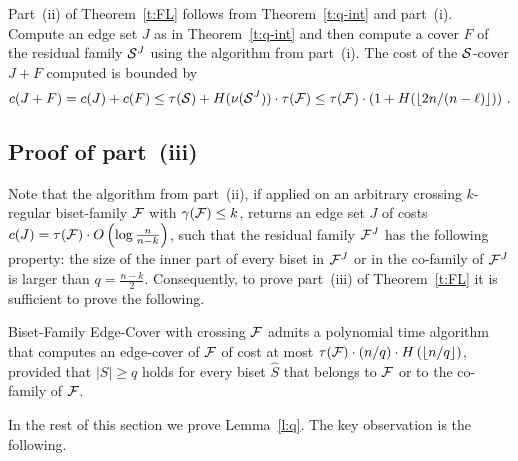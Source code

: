Part~(ii) of Theorem~\ref{t:FL} follows from Theorem~\ref{t:q-int} and part~(i).
Compute an edge set $J$ as in Theorem~\ref{t:q-int} and then compute 
a cover $F$ of the residual family ${\cal S}^J$ using the algorithm from part~(i). 
The cost of the ${\cal S}$-cover $J+F$ computed is bounded by
$$
c(J+F)=c(J)+c(F) \leq
\tau({\cal S}) + H(\nu({\cal S}^J)) \cdot \tau({\cal F}) \leq
\tau({\cal F}) \cdot (1+H(\lfloor 2n/(n-\ell) \rfloor)) \ .$$

\subsection{Proof of part~(iii)}

Note that the algorithm from part~(ii), if applied on an arbitrary crossing $k$-regular 
biset-family ${\cal F}$ with $\gamma({\cal F}) \leq k$, 
returns an edge set $J$ of costs $c(J)=\tau({\cal F}) \cdot O\left(\log \frac{n}{n-k}\right)$,
such that the residual family ${\cal F}^J$ has the following property: 
the size of the inner part of every biset
in ${\cal F}^J$ or in the co-family of ${\cal F}^J$ is larger than $q=\frac{n-k}{2}$.
Consequently, to prove part~(iii) of Theorem~\ref{t:FL} it is sufficient to prove
the following.

\begin{lemma} \label{l:q}
{\sf Biset-Family Edge-Cover} with crossing ${\cal F}$
admits a polynomial time algorithm that computes an edge-cover 
of ${\cal F}$ of cost at most 
$\tau({\cal F}) \cdot (n/q) \cdot H\left(\left\lfloor n/q \right\rfloor\right)$,
provided that $|S| \geq q$ holds
for every biset $\hat{S}$ that belongs to ${\cal F}$ or to the co-family of ${\cal F}$.
\end{lemma}

In the rest of this section we prove Lemma~\ref{l:q}. The key observation is the following.

